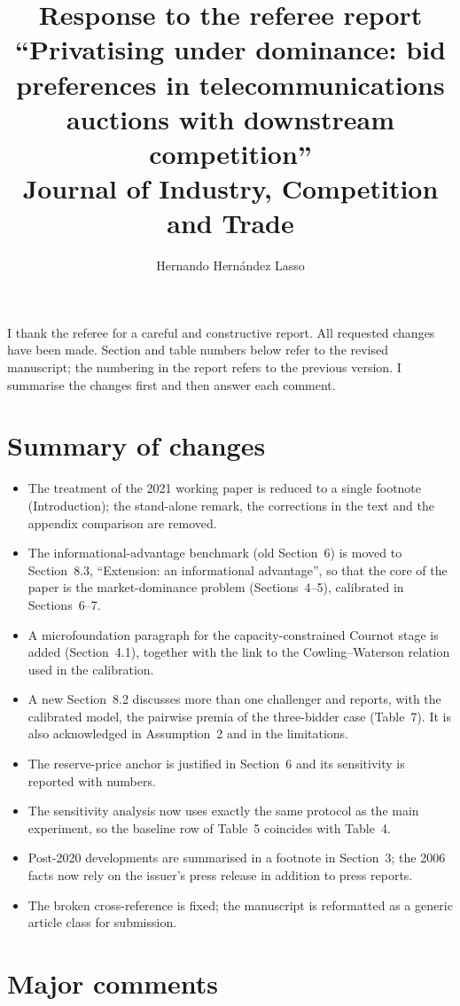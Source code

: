 \documentclass[11pt,a4paper]{article}
\title{Response to the referee report\\[4pt]\large ``Privatising under dominance: bid preferences in telecommunications auctions with downstream competition''\\ Journal of Industry, Competition and Trade}
\author{Hernando Hern\'andez Lasso}
\date{}
\begin{document}
\maketitle
\onehalfspacing

I thank the referee for a careful and constructive report. All requested changes have been made. Section and table numbers below refer to the revised manuscript; the numbering in the report refers to the previous version. I summarise the changes first and then answer each comment.

\section*{Summary of changes}
\begin{itemize}
\item The treatment of the 2021 working paper is reduced to a single footnote (Introduction); the stand-alone remark, the corrections in the text and the appendix comparison are removed.
\item The informational-advantage benchmark (old Section~6) is moved to Section~8.3, ``Extension: an informational advantage'', so that the core of the paper is the market-dominance problem (Sections~4--5), calibrated in Sections~6--7.
\item A microfoundation paragraph for the capacity-constrained Cournot stage is added (Section~4.1), together with the link to the Cowling--Waterson relation used in the calibration.
\item A new Section~8.2 discusses more than one challenger and reports, with the calibrated model, the pairwise premia of the three-bidder case (Table~7). It is also acknowledged in Assumption~2 and in the limitations.
\item The reserve-price anchor is justified in Section~6 and its sensitivity is reported with numbers.
\item The sensitivity analysis now uses exactly the same protocol as the main experiment, so the baseline row of Table~5 coincides with Table~4.
\item Post-2020 developments are summarised in a footnote in Section~3; the 2006 facts now rely on the issuer's press release in addition to press reports.
\item The broken cross-reference is fixed; the manuscript is reformatted as a generic article class for submission.
\end{itemize}

\section*{Major comments}
\end{document}
